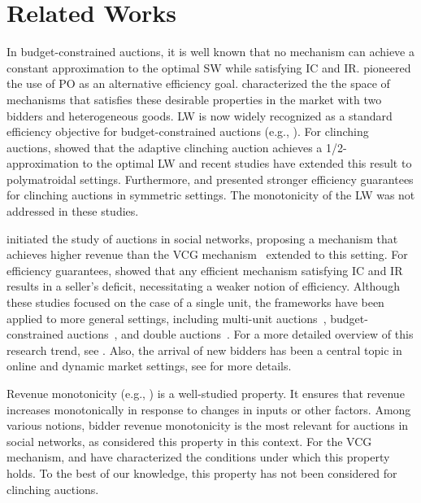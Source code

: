\section{Related Works}
In budget-constrained auctions, 
it is well known that no mechanism can achieve a constant approximation to the optimal SW while satisfying IC and IR. 
\citet{DLN2012} pioneered the use of PO as an alternative efficiency goal. 
\citet{GL2019} characterized the the space of mechanisms that satisfies these desirable properties 
in the market with two bidders and heterogeneous goods. 
LW \citep{DL2014,ST2013} is now widely recognized as a standard efficiency objective for budget-constrained auctions (e.g., \citep{FT2023, FLP2019,LX2015,LX2017}).
For clinching auctions, \citet{DL2014} showed that the adaptive clinching auction achieves a 1/2-approximation to the optimal LW and recent studies \citep{S2023,HS2025} have extended this result to polymatroidal settings. Furthermore,  \citet{DHH2013} and \citet{FH2018} presented stronger efficiency guarantees for clinching auctions in symmetric settings. The monotonicity of the LW was not addressed in these studies.

\citet{LHZZ2017} initiated the study of auctions in social networks, proposing a mechanism that achieves higher revenue than the VCG mechanism~\citep{V1961,C1971,G1973} extended to this setting. For efficiency guarantees, \citet{LHGZ2022} showed that any efficient mechanism satisfying IC and IR results in a seller's deficit, necessitating a weaker notion of efficiency. Although these studies focused on the case of a single unit, the frameworks have been applied to more general settings, including multi-unit auctions~\citep{ZLXHJ2018,TKTY2019,KBTTY2020,LLZ2023}, budget-constrained auctions~\citep{XSK2022}, and double auctions~\citep{LCZ2024,XHZ2019}. For a more detailed overview of this research trend, see \citet{Z2022}. Also, 
the arrival of new bidders has been a central topic in online and dynamic market settings, 
see \citet{P2007} for more details.

Revenue monotonicity (e.g., \citep{M2004,RCL2011}) is a well-studied property.  
It ensures that revenue increases monotonically in response to changes in inputs or other factors.  
Among various notions, bidder revenue monotonicity is the most relevant for auctions in social networks,  
as \citet{KBTTY2020} considered this property in this context.  
For the VCG mechanism, \citet{AM2002} and \citet{DRS2012} have characterized  
the conditions under which this property holds.  
To the best of our knowledge, this property has not been considered for clinching auctions.






